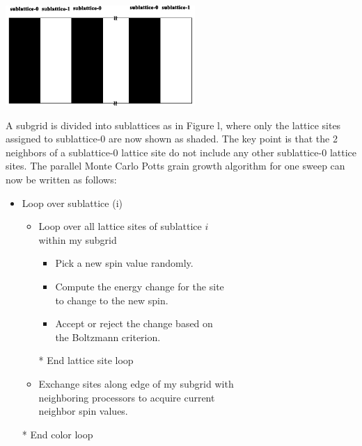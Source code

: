 \documentclass[11pt]{article}
\begin{document}
\begin{multicols}{2}
\begin{minipage}{0.45\textwidth}\centering
  \includegraphics[height=1.5in]{mc-fig-01}
\end{minipage}



A subgrid is divided into sublattices as in Figure l, where only the lattice sites assigned to sublattice-0 are now shown as shaded.
The key point is that the 2 neighbors of a sublattice-0 lattice site do not include any other sublattice-0 lattice sites.
The parallel Monte Carlo Potts grain growth algorithm for one sweep can now be written as follows:
\begin{minipage}{0.45\textwidth}\centering
\begin{shadebox}
\begin{itemize}
  \item Loop over sublattice (i)
  \begin{itemize}
    \item Loop over all lattice sites of sublattice $i$\\ within my subgrid
    \begin{itemize}
      \item Pick a new spin value randomly.
      \item Compute the energy change for the site\\ to change to the new spin.
      \item Accept or reject the change based on\\ the Boltzmann criterion.
    \end{itemize}
    \item[*] End lattice site loop
    \item Exchange sites along edge of my subgrid with\\ neighboring processors to acquire current\\ neighbor spin values.
    \end{itemize}
    \item[*] End color loop
\end{itemize}
\end{shadebox}
\end{minipage}


\end{multicols}
\end{document}
